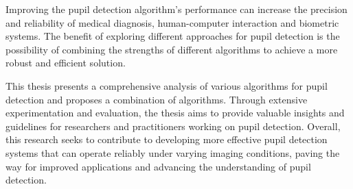 Improving the pupil detection algorithm's performance can increase the precision and reliability of medical diagnosis, human-computer interaction and biometric systems. The benefit of exploring different approaches for pupil detection is the possibility of combining the strengths of different algorithms to achieve a more robust and efficient solution.

This thesis presents a comprehensive analysis of various algorithms for pupil detection and proposes a combination of algorithms. Through extensive experimentation and evaluation, the thesis aims to provide valuable insights and guidelines for researchers and practitioners working on pupil detection. Overall, this research seeks to contribute to developing more effective pupil detection systems that can operate reliably under varying imaging conditions, paving the way for improved applications and advancing the understanding of pupil detection. 
